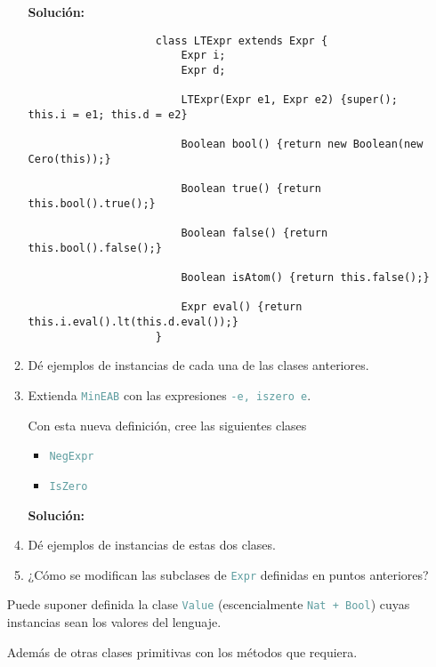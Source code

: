 \documentclass{article}
\newcommand{\tx}[1]{\textcolor{CadetBlue} {\texttt{#1}}}
\newcommand{\tb}[1]{\textcolor{RoyalPurple} {\textbf{#1}}}
\begin{document}
\begin{enumerate}
\begin{enumerate}
            \tb{Solución:}

                \begin{verbatim}
                    class LTExpr extends Expr {
                        Expr i;
                        Expr d;

                        LTExpr(Expr e1, Expr e2) {super(); this.i = e1; this.d = e2}

                        Boolean bool() {return new Boolean(new Cero(this));}

                        Boolean true() {return this.bool().true();}

                        Boolean false() {return this.bool().false();}

                        Boolean isAtom() {return this.false();}

                        Expr eval() {return this.i.eval().lt(this.d.eval());}
                    }
                \end{verbatim}

            \item Dé ejemplos de instancias de cada una de las clases 
            anteriores.

            \item Extienda \tx{MinEAB} con las expresiones \tx{-e, iszero e}.

            Con esta nueva definición, cree las siguientes clases

            \begin{itemize}
                \item \tx{NegExpr}
                \item \tx{IsZero}
            \end{itemize}

            \tb{Solución:}

            \item Dé ejemplos de instancias de estas dos clases.

            \item ¿Cómo se modifican las subclases de \tx{Expr} definidas en
            puntos anteriores?
        \end{enumerate}

        Puede suponer definida la clase \tx{Value} (escencialmente 
        \tx{Nat + Bool}) cuyas instancias sean los valores del lenguaje.

        Además de otras clases primitivas con los métodos que requiera.


\end{enumerate}
\end{document}
